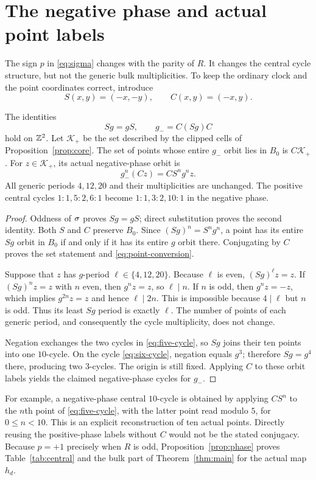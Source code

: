\section{The negative phase and actual point labels}\label{sec:phase}

The sign $p$ in \eqref{eq:sigma} changes with the parity of $R$.
It changes the central cycle structure, but not the generic bulk
multiplicities. To keep the ordinary clock and the point coordinates
correct, introduce
\[
 S(x,y)=(-x,-y),\qquad C(x,y)=(-x,y).
\]

\begin{proposition}\label{prop:phase}
The identities
\begin{equation}\label{eq:phase}
 Sg=gS,\qquad g_-=C(Sg)C
\end{equation}
hold on $\mathbb Z^2$. Let $\mathcal K_+$ be the set described by the
clipped cells of Proposition~\ref{prop:core}. The set of points whose
entire $g_-$ orbit lies in $B_0$ is $C\mathcal K_+$. For
$z\in\mathcal K_+$, its actual negative-phase orbit is
\begin{equation}\label{eq:point-conversion}
 g_-^n(Cz)=C S^n g^n z.
\end{equation}
All generic periods $4,12,20$ and their multiplicities are unchanged.
The positive central cycles $1:1,5:2,6:1$ become
$1:1,3:2,10:1$ in the negative phase.
\end{proposition}
\begin{proof}
Oddness of $\sigma$ proves $Sg=gS$; direct substitution proves the
second identity. Both $S$ and $C$ preserve $B_0$. Since
$(Sg)^n=S^ng^n$, a point has its entire $Sg$ orbit in $B_0$
if and only if it has its entire $g$ orbit there. Conjugating by
$C$ proves the set statement and \eqref{eq:point-conversion}.

Suppose that $z$ has $g$-period $\ell\in\{4,12,20\}$. Because
$\ell$ is even, $(Sg)^\ell z=z$. If $(Sg)^nz=z$ with $n$
even, then $g^nz=z$, so $\ell\mid n$. If $n$ is odd, then
$g^nz=-z$, which implies $g^{2n}z=z$ and hence $\ell\mid2n$.
This is impossible because $4\mid\ell$ but $n$ is odd.
Thus its least $Sg$ period is exactly $\ell$. The number of points
of each generic period, and consequently the cycle multiplicity,
does not change.

Negation exchanges the two cycles in \eqref{eq:five-cycle}, so $Sg$
joins their ten points into one $10$-cycle. On the cycle
\eqref{eq:six-cycle}, negation equals $g^3$; therefore $Sg=g^4$
there, producing two $3$-cycles. The origin is still fixed.
Applying $C$ to these orbit labels yields the claimed negative-phase
cycles for $g_-$.
\end{proof}

For example, a negative-phase central $10$-cycle is obtained by
applying $C S^n$ to the $n$th point of \eqref{eq:five-cycle}, with
the latter point read modulo $5$, for $0\le n<10$. This is an
explicit reconstruction of ten actual points. Directly reusing
the positive-phase labels without $C$ would not be the stated
conjugacy. Because $p=+1$ precisely when $R$ is odd,
Proposition~\ref{prop:phase} proves Table~\ref{tab:central} and the
bulk part of Theorem~\ref{thm:main} for the actual map $h_d$.

